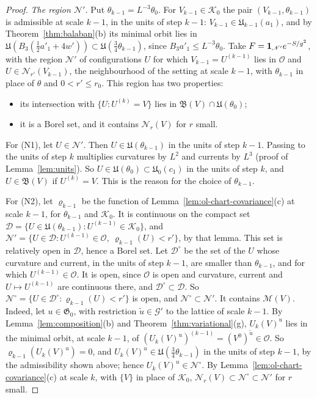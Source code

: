 \begin{proof}
\emph{The region $\mathscr N'$.} Put $\theta_{k-1}=L^{-3}\theta_0$. For $V_{k-1}\in\mathcal K_0$ the pair $(V_{k-1},\theta_{k-1})$ is admissible at scale $k-1$, in the units of step $k-1$: $V_{k-1}\in\mathfrak U_{k-1}(a_1)$, and by Theorem~\ref{thm:balaban}(b) its minimal orbit lies in $\mathfrak U(B_3(\frac12a'_1+4w'))\subset\mathfrak U(\frac34\theta_{k-1})$, since $B_3a'_1\le L^{-3}\theta_0$. Take $F=\mathbf 1_{\mathscr N'}e^{-S/g^2}$, with the region $\mathscr N'$ of configurations $U$ for which $V_{k-1}=U^{(k-1)}$ lies in $\mathscr O$ and $U\in\mathscr N_{r'}(V_{k-1})$, the neighbourhood of the setting at scale $k-1$, with $\theta_{k-1}$ in place of $\theta$ and $0<r'\le r_0$. This region has two properties:
\begin{itemize}
\item[(N1)] its intersection with $\{U:U^{(k)}=V\}$ lies in $\mathfrak B(V)\cap\mathfrak U(\theta_0)$;
\item[(N2)] it is a Borel set, and it contains $\mathscr N_r(V)$ for $r$ small.
\end{itemize}
For (N1), let $U\in\mathscr N'$. Then $U\in\mathfrak U(\theta_{k-1})$ in the units of step $k-1$. Passing to the units of step $k$ multiplies curvatures by $L^2$ and currents by $L^3$ (proof of Lemma~\ref{lem:units}). So $U\in\mathfrak U(\theta_0)\subset\mathfrak U_0(c_1)$ in the units of step $k$, and $U\in\mathfrak B(V)$ if $U^{(k)}=V$. This is the reason for the choice of $\theta_{k-1}$.

For (N2), let $\varrho_{k-1}$ be the function of Lemma~\ref{lem:ol-chart-covariance}(c) at scale $k-1$, for $\theta_{k-1}$ and $\mathcal K_0$. It is continuous on the compact set $\mathcal D=\{U\in\mathfrak U(\theta_{k-1}):U^{(k-1)}\in\mathcal K_0\}$, and $\mathscr N'=\{U\in\mathcal D:U^{(k-1)}\in\mathscr O,\ \varrho_{k-1}(U)<r'\}$, by that lemma. This set is relatively open in $\mathcal D$, hence a Borel set. Let $\mathcal D^\circ$ be the set of the $U$ whose curvature and current, in the units of step $k-1$, are smaller than $\theta_{k-1}$, and for which $U^{(k-1)}\in\mathscr O$. It is open, since $\mathscr O$ is open and curvature, current and $U\mapsto U^{(k-1)}$ are continuous there, and $\mathcal D^\circ\subset\mathcal D$. So $\mathscr N^\circ=\{U\in\mathcal D^\circ:\varrho_{k-1}(U)<r'\}$ is open, and $\mathscr N^\circ\subset\mathscr N'$. It contains $\mathscr M(V)$. Indeed, let $u\in\mathfrak G_0$, with restriction $\tilde u\in\mathcal G'$ to the lattice of scale $k-1$. By Lemma~\ref{lem:composition}(b) and Theorem~\ref{thm:variational}(g), $U_k(V)^u$ lies in the minimal orbit, at scale $k-1$, of $(U_k(V)^u)^{(k-1)}=(V^0)^{\tilde u}\in\mathscr O$. So $\varrho_{k-1}(U_k(V)^u)=0$, and $U_k(V)^u\in\mathfrak U(\frac34\theta_{k-1})$ in the units of step $k-1$, by the admissibility shown above; hence $U_k(V)^u\in\mathscr N^\circ$. By Lemma~\ref{lem:ol-chart-covariance}(c) at scale $k$, with $\{V\}$ in place of $\mathcal K_0$, $\mathscr N_r(V)\subset\mathscr N^\circ\subset\mathscr N'$ for $r$ small.


\end{proof}
